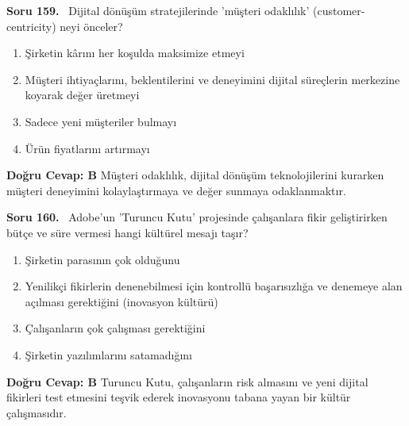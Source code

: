 \documentclass[11pt,a4paper,openany]{book}
\begin{document}
\needspace{5cm}
\vspace{8pt}
\noindent\textbf{\large\sffamily Soru 159.} \ Dijital dönüşüm stratejilerinde 'müşteri odaklılık' (customer-centricity) neyi önceler?
\begin{enumerate}[label=\Alph*), leftmargin=25pt, topsep=4pt, itemsep=2pt]
    \item Şirketin kârını her koşulda maksimize etmeyi
    \item Müşteri ihtiyaçlarını, beklentilerini ve deneyimini dijital süreçlerin merkezine koyarak değer üretmeyi
    \item Sadece yeni müşteriler bulmayı
    \item Ürün fiyatlarını artırmayı
\end{enumerate}
\vspace{4pt}
\begin{tcolorbox}[title=Cevap ve Açıklama, colback=gray!3!white, colframe=primarycolor!90!black, arc=2mm, fonttitle=\bfseries\sffamily, top=6pt, bottom=6pt]
    \textbf{Doğru Cevap: B}
    \vspace{2pt}
    Müşteri odaklılık, dijital dönüşüm teknolojilerini kurarken müşteri deneyimini kolaylaştırmaya ve değer sunmaya odaklanmaktır.
\end{tcolorbox}
\vspace{10pt}

\needspace{5cm}
\vspace{8pt}
\noindent\textbf{\large\sffamily Soru 160.} \ Adobe'un 'Turuncu Kutu' projesinde çalışanlara fikir geliştirirken bütçe ve süre vermesi hangi kültürel mesajı taşır?
\begin{enumerate}[label=\Alph*), leftmargin=25pt, topsep=4pt, itemsep=2pt]
    \item Şirketin parasının çok olduğunu
    \item Yenilikçi fikirlerin denenebilmesi için kontrollü başarısızlığa ve denemeye alan açılması gerektiğini (inovasyon kültürü)
    \item Çalışanların çok çalışması gerektiğini
    \item Şirketin yazılımlarını satamadığını
\end{enumerate}
\vspace{4pt}
\begin{tcolorbox}[title=Cevap ve Açıklama, colback=gray!3!white, colframe=primarycolor!90!black, arc=2mm, fonttitle=\bfseries\sffamily, top=6pt, bottom=6pt]
    \textbf{Doğru Cevap: B}
    \vspace{2pt}
    Turuncu Kutu, çalışanların risk almasını ve yeni dijital fikirleri test etmesini teşvik ederek inovasyonu tabana yayan bir kültür çalışmasıdır.
\end{tcolorbox}
\vspace{10pt}
\end{document}
